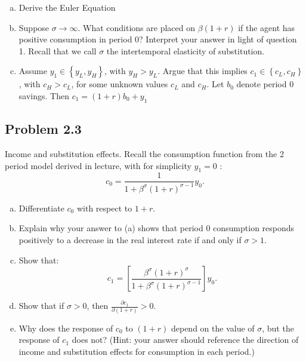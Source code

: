 \documentclass[11pt]{extarticle}
\theoremstyle{plain}
\theoremstyle{definition}
\begin{document}
\begin{enumerate}[(a)]

\item Derive the Euler Equation



\item Suppose $\sigma \rightarrow \infty$. What conditions are placed on $\beta(1+r)$ if the agent has positive consumption in period 0? Interpret your answer in light of question 1. Recall that we call $\sigma$ the intertemporal elasticity of substitution.


\item Assume $y_1 \in\left\{y_L, y_H\right\}$, with $y_H>y_L$. Argue that this implies $c_1 \in\left\{c_L, c_H\right\}$, with $c_H>c_L$, for some unknown values $c_L$ and $c_H$. Let $b_0$ denote period 0 savings. Then $c_1=(1+r) b_0+y_1$



\end{enumerate}


\subsection*{Problem 2.3}
 Income and substitution effects. Recall the consumption function from the 2 period model derived in lecture, with for simplicity $y_1=0$ :
$$
c_0=\frac{1}{1+\beta^\sigma(1+r)^{\sigma-1}} y_0 .
$$

\begin{enumerate}[(a)]

\item Differentiate $c_0$ with respect to $1+r$.



\item Explain why your answer to (a) shows that period 0 consumption responds positively to a decrease in the real interest rate if and only if $\sigma>1$. 

\item  Show that:
$$
c_1=\left[\frac{\beta^\sigma(1+r)^\sigma}{1+\beta^\sigma(1+r)^{\sigma-1}}\right] y_0 .
$$



\item Show that if $\sigma>0$, then $\frac{\partial c_1}{\partial(1+r)}>0$.

\item  Why does the response of $c_0$ to $(1+r)$ depend on the value of $\sigma$, but the response of $c_1$ does not? (Hint: your answer should reference the direction of income and substitution effects for consumption in each period.)

\end{enumerate}
\end{document}
